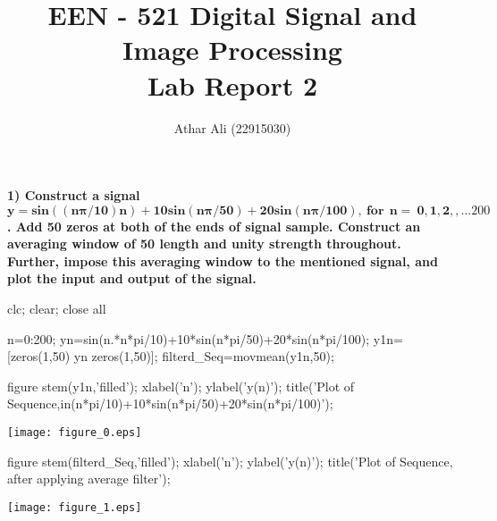 \documentclass[12pt, onecolumn]{IEEEtran}
\begin{document}
	\author{Athar Ali (22915030)}
	\title{\bf{ \large EEN - 521 Digital Signal and Image Processing\\ Lab Report 2}}
	\maketitle 
	 {}
	
	
	
	\vspace{1em}
	\begin{par}
		\begin{flushleft}
			\textbf{1) Construct a signal $\mathbf{y = sin((n\pi/10)n) + 10 sin(n\pi/50) + 20 sin(n\pi/100), \ for \ \ n = \ {0, 1, 2, ,...200}}$. Add 50 zeros at both of the ends of signal sample. Construct an averaging window of 50 length and unity strength throughout. Further, impose this averaging window to the mentioned signal, and plot the input and output of the signal.} 
		\end{flushleft}
	\end{par}
	
	\begin{matlabcode}
		clc; %
		clear; %
		close all %
		
		
		n=0:200; %
		yn=sin(n.*n*pi/10)+10*sin(n*pi/50)+20*sin(n*pi/100); %
		y1n=[zeros(1,50) yn zeros(1,50)]; %
		filterd_Seq=movmean(y1n,50); %
		
		figure
		stem(y1n,'filled'); %
		xlabel('n'); 
		ylabel('y(n)');
		title('Plot of Sequence,in(n*pi/10)+10*sin(n*pi/50)+20*sin(n*pi/100)');
	\end{matlabcode}
\begin{center}
\texttt{[image: figure\_0.eps]}
\end{center}
\begin{matlabcode}

figure
stem(filterd_Seq,'filled'); %
xlabel('n'); 
ylabel('y(n)');
title('Plot of Sequence, after applying average filter');
\end{matlabcode}
\begin{center}
\texttt{[image: figure\_1.eps]}
\end{center}
\end{document}
